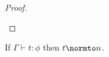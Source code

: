 \begin{proof}
\begin{itemize}
\end{itemize}
\end{proof}
\begin{corollary}[Normalization]
  If $\Gamma \vdash t:\phi$ then $t \normto n$.
\end{corollary}
